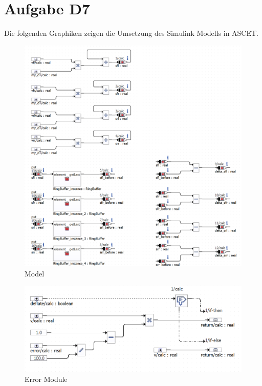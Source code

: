
\chapter{Aufgabe D7}
Die folgenden Graphiken zeigen die Umsetzung des Simulink Modells in ASCET.

\begin{figure}[h!]
	\centering
	\includegraphics[width=1\linewidth]{../Graphiken/Model.png}
	\caption{Model}
	\label{fig:Model}
\end{figure}

\begin{figure}[h!]
	\centering
	\includegraphics[width=1\linewidth]{../Graphiken/ErrorModule.png}
	\caption{Error Module}
	\label{fig:ErrorModule}
\end{figure}

